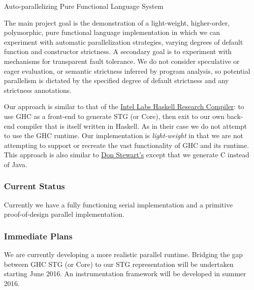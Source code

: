 \documentclass[DIV16,twocolumn,10pt]{scrreprt}
\begin{document}
\begin{hcarentry}{Auto-parallelizing Pure Functional Language System}
\makeheader


The main project goal is the demonstration of a light-weight, higher-order,
polymorphic, pure functional language implementation in which we can
experiment with automatic parallelization strategies, varying degrees of
default function and constructor strictness.  A secondary goal is to
experiment with mechanisms for transparent fault tolerance.
%
We do not consider speculative or eager evaluation, or semantic strictness
inferred by program analysis, so potential parallelism is dictated by the
specified degree of default strictness and any strictness annotations.

Our approach is similar to that of the
\href{https://dl.acm.org/citation.cfm?id=2503779}{Intel Labs Haskell Research
  Compiler}: to use GHC as a front-end to generate STG (or Core), then exit to
our own back-end compiler that is itself written in Haskell.  As in their case
we do not attempt to use the GHC runtime.  Our implementation is
\emph{light-weight} in that we are not attempting to support or recreate the
vast functionality of GHC and its runtime.  This approach is also similar to
\href{http://www.cse.unsw.edu.au/~pls/thesis/dons-thesis.ps.gz}{Don Stewart's}
except that we generate C instead of Java.

\subsubsection*{Current Status}
Currently we have a fully functioning serial implementation and a primitive
proof-of-design parallel implementation.


\subsubsection*{Immediate Plans}

We are currently developing a more realistic parallel runtime.
%
Bridging the gap between GHC STG (or Core) to our STG representation will be
undertaken starting June 2016.  An instrumentation framework will be developed
in summer 2016.


\end{hcarentry}
\end{document}
